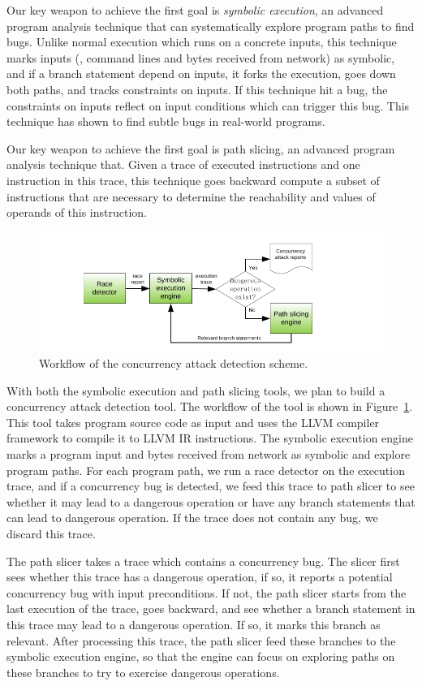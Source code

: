 Our key weapon to achieve the first goal is \emph{symbolic execution}, an 
advanced program analysis technique that can systematically explore program 
paths to find bugs. Unlike normal execution which runs on a concrete 
inputs, this technique marks inputs (\eg, command lines and bytes received from 
network) as symbolic, and if a branch statement depend on inputs, it forks the 
execution, goes down both paths, and tracks constraints on inputs. If this 
technique hit a bug, the constraints on inputs reflect on input conditions 
which can trigger this bug. This technique has shown to find subtle bugs in 
real-world programs.

Our key weapon to achieve the first goal is path slicing, an advanced program 
analysis technique that. Given a trace of executed instructions and one 
instruction in this trace, this technique goes backward compute a subset of 
instructions that are necessary to determine the reachability and values of 
operands of this instruction.

\begin{figure}[t]
\centering
\includegraphics[width=0.5\columnwidth]{figures/detection}
\vspace{-.05in}
\caption{{Workflow of the concurrency attack detection scheme.}} 
\label{fig:detection}
\vspace{-.05in}
\end{figure}

With both the symbolic execution and path slicing tools, we plan to build a 
concurrency attack detection tool. The workflow of the tool is shown in 
Figure~\ref{fig:detection}. This tool takes program source code as input and 
uses the LLVM compiler framework to compile it to LLVM IR instructions. The 
symbolic execution engine marks a program input and bytes received from network 
as symbolic and explore program paths. For each program path, we run a race 
detector on the execution trace, and if a concurrency bug is detected, we feed 
this trace to path slicer to see whether it may lead to a dangerous operation 
or have any branch statements that can lead to dangerous operation. If the 
trace does not contain any bug, we discard this trace.

The path slicer takes a trace which contains a concurrency bug. The slicer 
first sees whether this trace has a dangerous operation, if so, it reports a 
potential concurrency bug with input preconditions. If not, the path slicer 
starts from the last execution of the trace, goes backward, and see whether a 
branch statement in this trace may lead to a dangerous operation. If so, it 
marks this branch as relevant. After processing this trace, the path slicer 
feed these branches to the symbolic execution engine, so that the engine can 
focus on exploring paths on these branches to try to exercise dangerous 
operations.

